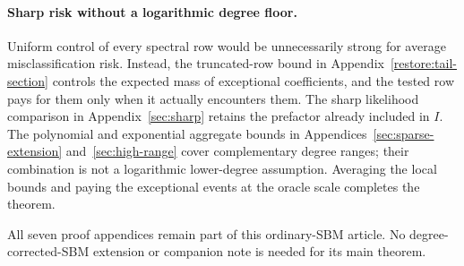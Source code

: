 \paragraph{Sharp risk without a logarithmic degree floor.}
Uniform control of every spectral row would be unnecessarily strong
for average misclassification risk. Instead, the truncated-row bound
in Appendix~\ref{restore:tail-section} controls the expected mass of
exceptional coefficients, and the tested row pays for them only when
it actually encounters them. The sharp likelihood comparison in
Appendix~\ref{sec:sharp} retains the prefactor already included in
$I$. The polynomial and exponential aggregate bounds in
Appendices~\ref{sec:sparse-extension} and~\ref{sec:high-range} cover
complementary degree ranges; their combination is not a logarithmic
lower-degree assumption. Averaging the local bounds and paying the
exceptional events at the oracle scale completes the theorem.

All seven proof appendices remain part of this ordinary-SBM article.
No degree-corrected-SBM extension or companion note is needed for its
main theorem.
